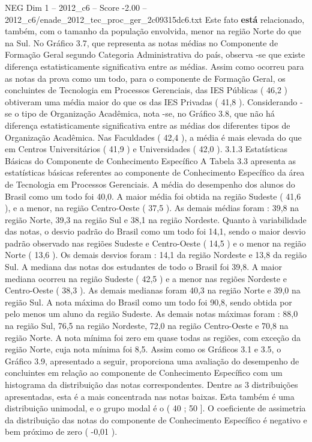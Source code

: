 \begin{textsample}{NEG Dim 1 – 2012\_c6 – Score -2.00 – 2012\_c6/enade\_2012\_tec\_proc\_ger\_2c09315dc6.txt}
Este fato \textbf{está} relacionado, também, com o tamanho da população envolvida, menor na região Norte do que na Sul.
No Gráfico 3.7, que representa as notas médias no Componente de Formação Geral segundo Categoria Administrativa do país, observa -se que existe diferença estatisticamente significativa entre as médias.
Assim como ocorreu para as notas da prova como um todo, para o componente de Formação Geral, os concluintes de Tecnologia em Processos Gerenciais, das IES Públicas ( 46,2 ) obtiveram uma média maior do que os das IES Privadas ( 41,8 ).
Considerando -se o tipo de Organização Acadêmica, nota -se, no Gráfico 3.8, que não há diferença estatisticamente significativa entre as médias dos diferentes tipos de Organização Acadêmica.
Nas Faculdades ( 42,4 ), a média é mais elevada do que em Centros Universitários ( 41,9 ) e Universidades ( 42,0 ). 3.1.3 Estatísticas Básicas do Componente de Conhecimento Específico A Tabela 3.3 apresenta as estatísticas básicas referentes ao componente de Conhecimento Específico da área de Tecnologia em Processos Gerenciais.
A média do desempenho dos alunos do Brasil como um todo foi 40,0.
A maior média foi obtida na região Sudeste ( 41,6 ), e a menor, na região Centro-Oeste ( 37,5 ).
As demais médias foram : 39,8 na região Norte, 39,3 na região Sul e 38,1 na região Nordeste.
Quanto à variabilidade das notas, o desvio padrão do Brasil como um todo foi 14,1, sendo o maior desvio padrão observado nas regiões Sudeste e Centro-Oeste ( 14,5 ) e o menor na região Norte ( 13,6 ).
Os demais desvios foram : 14,1 da região Nordeste e 13,8 da região Sul.
A mediana das notas dos estudantes de todo o Brasil foi 39,8.
A maior mediana ocorreu na região Sudeste ( 42,5 ) e a menor nas regiões Nordeste e Centro-Oeste ( 38,3 ).
As demais medianas foram 40,3 na região Norte e 39,0 na região Sul.
A nota máxima do Brasil como um todo foi 90,8, sendo obtida por pelo menos um aluno da região Sudeste.
As demais notas máximas foram : 88,0 na região Sul, 76,5 na região Nordeste, 72,0 na região Centro-Oeste e 70,8 na região Norte.
A nota mínima foi zero em quase todas as regiões, com exceção da região Norte, cuja nota mínima foi 8,5.
Assim como os Gráficos 3.1 e 3.5, o Gráfico 3.9, apresentado a seguir, proporciona uma avaliação do desempenho de concluintes em relação ao componente de Conhecimento Específico com um histograma da distribuição das notas correspondentes.
Dentre as 3 distribuições apresentadas, esta é a mais concentrada nas notas baixas.
Esta também é uma distribuição unimodal, e o grupo modal é o ( 40 ; 50 ].
O coeficiente de assimetria da distribuição das notas do componente de Conhecimento Específico é negativo e bem próximo de zero ( -0,01 ).

\end{textsample}
